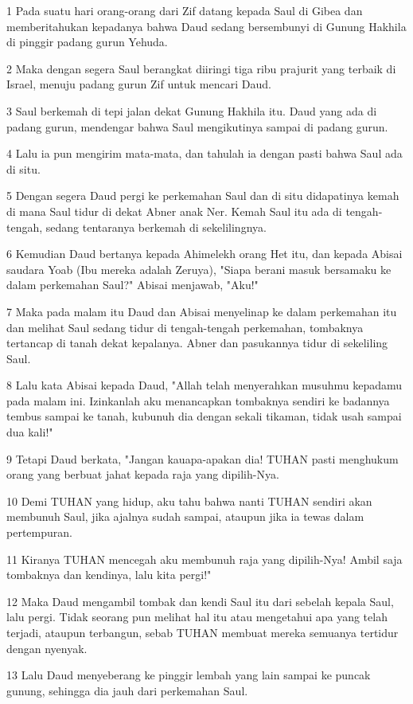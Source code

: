 \par 1 Pada suatu hari orang-orang dari Zif datang kepada Saul di Gibea dan memberitahukan kepadanya bahwa Daud sedang bersembunyi di Gunung Hakhila di pinggir padang gurun Yehuda.
\par 2 Maka dengan segera Saul berangkat diiringi tiga ribu prajurit yang terbaik di Israel, menuju padang gurun Zif untuk mencari Daud.
\par 3 Saul berkemah di tepi jalan dekat Gunung Hakhila itu. Daud yang ada di padang gurun, mendengar bahwa Saul mengikutinya sampai di padang gurun.
\par 4 Lalu ia pun mengirim mata-mata, dan tahulah ia dengan pasti bahwa Saul ada di situ.
\par 5 Dengan segera Daud pergi ke perkemahan Saul dan di situ didapatinya kemah di mana Saul tidur di dekat Abner anak Ner. Kemah Saul itu ada di tengah-tengah, sedang tentaranya berkemah di sekelilingnya.
\par 6 Kemudian Daud bertanya kepada Ahimelekh orang Het itu, dan kepada Abisai saudara Yoab (Ibu mereka adalah Zeruya), "Siapa berani masuk bersamaku ke dalam perkemahan Saul?" Abisai menjawab, "Aku!"
\par 7 Maka pada malam itu Daud dan Abisai menyelinap ke dalam perkemahan itu dan melihat Saul sedang tidur di tengah-tengah perkemahan, tombaknya tertancap di tanah dekat kepalanya. Abner dan pasukannya tidur di sekeliling Saul.
\par 8 Lalu kata Abisai kepada Daud, "Allah telah menyerahkan musuhmu kepadamu pada malam ini. Izinkanlah aku menancapkan tombaknya sendiri ke badannya tembus sampai ke tanah, kubunuh dia dengan sekali tikaman, tidak usah sampai dua kali!"
\par 9 Tetapi Daud berkata, "Jangan kauapa-apakan dia! TUHAN pasti menghukum orang yang berbuat jahat kepada raja yang dipilih-Nya.
\par 10 Demi TUHAN yang hidup, aku tahu bahwa nanti TUHAN sendiri akan membunuh Saul, jika ajalnya sudah sampai, ataupun jika ia tewas dalam pertempuran.
\par 11 Kiranya TUHAN mencegah aku membunuh raja yang dipilih-Nya! Ambil saja tombaknya dan kendinya, lalu kita pergi!"
\par 12 Maka Daud mengambil tombak dan kendi Saul itu dari sebelah kepala Saul, lalu pergi. Tidak seorang pun melihat hal itu atau mengetahui apa yang telah terjadi, ataupun terbangun, sebab TUHAN membuat mereka semuanya tertidur dengan nyenyak.
\par 13 Lalu Daud menyeberang ke pinggir lembah yang lain sampai ke puncak gunung, sehingga dia jauh dari perkemahan Saul.
